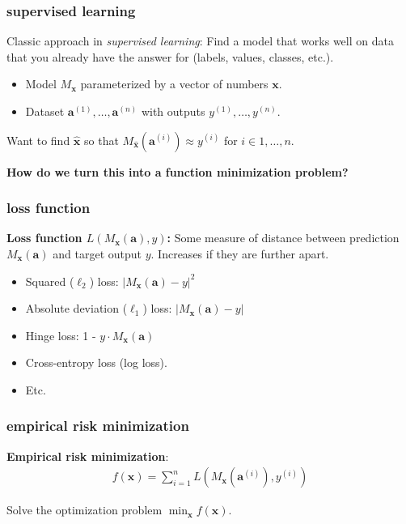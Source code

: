 \documentclass[compress]{beamer}
\newcommand{\bv}[1]{\mathbf{#1}}
\begin{document}
\begin{frame}
	\frametitle{supervised learning}
	Classic approach in \emph{supervised learning}: Find a model that works well on data that you already have the answer for (labels, values, classes, etc.).
	\begin{itemize}
		\item Model $M_{\bv{x}}$ parameterized by a vector of numbers $\bv{x}$.
		\item Dataset $\bv{a}^{(1)}, \ldots,  \bv{a}^{(n)}$ with outputs $y^{(1)}, \ldots, y^{(n)}$.
	\end{itemize}
	\begin{center}
		Want to find $\hat{\bv{x}}$ so that $M_{\hat{\bv{x}}}(\bv{a}^{(i)}) \approx y^{(i)}$ for $i \in 1,\ldots, n$.
		
		\alert{\textbf{How do we turn this into a function minimization problem?}}
	\end{center}
\end{frame}

\begin{frame}
	\frametitle{loss function}
	\textbf{Loss function $L\left(M_{\bv{x}}(\bv{a}), y\right)$:} Some measure of distance between prediction $M_{\bv{x}}(\bv{a})$ and target output $y$. Increases if they are further apart.
	\begin{itemize}
		\item Squared ($\ell_2$) loss: $|M_{{\bv{x}}}(\bv{a}) - y|^2$
		\item Absolute deviation ($\ell_1$) loss: $|M_{{\bv{x}}}(\bv{a}) - y|$
		\item Hinge loss: 1 - $y \cdot M_{{\bv{x}}}(\bv{a})$ 
		\item Cross-entropy loss (log loss). 
		\item Etc.
	\end{itemize}
\end{frame}

\begin{frame}
	\frametitle{empirical risk minimization}
	\textbf{Empirical risk minimization}:
	\begin{align*}
		f(\bv{x}) = \sum_{i=1}^n L\left(M_{\bv{x}}(\bv{a}^{(i)}), y^{(i)}\right)
	\end{align*}
	\begin{center}
		Solve the optimization problem $\min_{\bv{x}} f(\bv{x})$.
	\end{center}
\end{frame}
\end{document}
